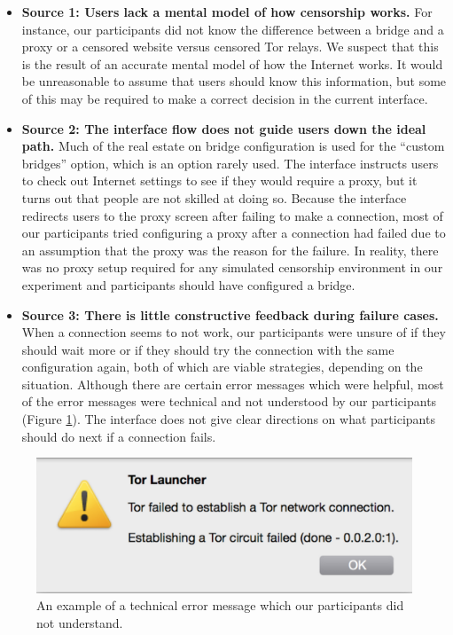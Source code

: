 \documentclass{template}
\begin{document}
\begin{itemize} \itemsep1pt \parskip0pt 
\item {\bfseries Source 1: Users lack a mental model of how censorship works.} For instance, our participants did not know the difference between a bridge and a proxy or a censored website versus censored Tor relays. We suspect that this is the result of an accurate mental model of how the Internet works.  It would be unreasonable to assume that users should know this information, but some of this may be required to make a correct decision in the current interface. 
\item {\bfseries Source 2: The interface flow does not guide users down the ideal path.} Much of the real estate on bridge configuration is used for the ``custom bridges'' option, which is an option rarely used. The interface instructs users to check out Internet settings to see if they would require a proxy, but it turns out that people are not skilled at doing so. Because the interface redirects users to the proxy screen after failing to make a connection, most of our participants tried configuring a proxy after a connection had failed due to an assumption that the proxy was the reason for the failure. In reality, there was no proxy setup required for any simulated censorship environment in our experiment and participants should have configured a bridge. 
\item {\bfseries Source 3: There is little constructive feedback during failure cases.} When a connection seems to not work, our participants were unsure of if they should wait more or if they should try the connection with the same configuration again, both of which are viable strategies, depending on the situation. Although there are certain error messages which were helpful, most of the error messages were technical and not understood by our participants (Figure \ref{fig:error}). The interface does not give clear directions on what participants should do next if a connection fails. 
\end{itemize}

\begin{figure}[t]
\label{fig:error}
  \centering
    \includegraphics[width=\textwidth]{error.png}
    \caption{An example of a technical error message which our participants did not understand.}
\end{figure}
\end{document}
